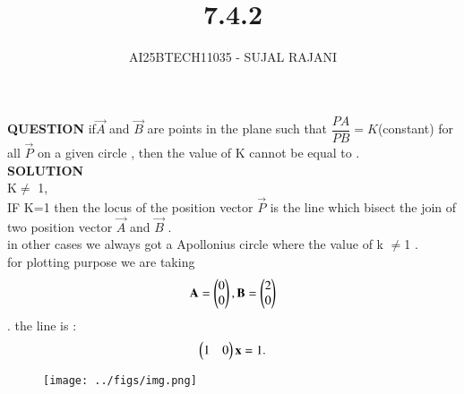 \documentclass[journal,12pt,onecolumn]{IEEEtran}
\begin{document}
\title{7.4.2}
\author{AI25BTECH11035 - SUJAL RAJANI}
{\let\newpage\relax\maketitle}
\textbf{QUESTION}
if$\vec{A}$ and $\vec{B}$ are points in the plane such that $\dfrac{PA}{PB}=K$(constant) for all $\vec{P}$ on a given circle , then the value of K cannot be equal to .
\\
\textbf{SOLUTION}
\\
 K$\neq$ 1,
 \\
 IF K=1 then the locus of the position vector $\vec{P}$ is the line which bisect the join of two position vector $\vec{A}$ and $\vec{B}$ .
 \\
 in other cases we always got a Apollonius circle where the value of k $\neq $1 . 
\\
for plotting purpose we are taking 
 \begin{align*}
     \mathbf{A}=\begin{pmatrix}0\\0\end{pmatrix}, \mathbf{B}=\begin{pmatrix}2\\0\end{pmatrix}
 \end{align*} .
 the line is :
 \begin{align*}
     \begin{pmatrix}1&0\end{pmatrix}\mathbf{x}=1.
 \end{align*}
        \begin{figure}[H]
    \centering
    \texttt{[image: ../figs/img.png]}
    \caption*{}
    \label{figs}
\end{figure}
\end{document}

